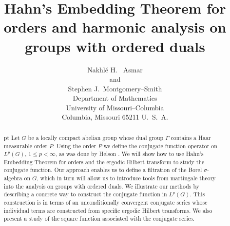 \setlength\textwidth{6in}
\setlength\oddsidemargin{0.25in}
\topmargin -20mm
\footskip 12mm
\textheight 56pc
\def\Bbb#1{{\mathchoice{\mbox{\bf #1}}{\mbox{\bf #1}}%
{\mbox{$\scriptstyle \bf #1$}}{\mbox{$\scriptscriptstyle \bf #1$}}}}
\def\N{\Bbb N}
\def\R{\Bbb R}
\def\C{\Bbb C}
\def\Z{\Bbb Z}
\def\T{\Bbb T}
\def\Q{\Bbb Q}
\def\E{\Bbb E}
\def\O{\Omega}
\def\sgn{{\rm sgn}}
\def\H{{\cal H}_P}
\def\e{\epsilon}
\def\A{{\cal A}}
\def\cT{{\cal T}}




\title{Hahn's Embedding Theorem for orders
and harmonic analysis on groups with ordered duals}
\author{Nakhl\'e H. \ Asmar\\
 and 
 \\Stephen J.\ Montgomery--Smith\\
Department of Mathematics\\
University of
Missouri--Columbia\\
Columbia, Missouri 65211  U.\ S.\ A.
}
\date{}
\maketitle
\begin{abstract}
 pt
Let $G$ be a locally compact abelian group whose dual
group $\Gamma$ contains a Haar measurable order $P$.
Using the order $P$ we define the conjugate function
operator on $L^p(G)$, $1\leq p<\infty$,
 as was done by Helson \cite{hel1}.
We will show how to use Hahn's Embedding Theorem
for orders and the ergodic Hilbert transform to study the 
conjugate function.
Our approach enables us to 
define a filtration of the Borel $\sigma$-algebra
on $G$, which in turn will allow us to introduce 
tools from martingale theory into the analysis on 
groups with ordered duals.
We illustrate our methods by 
describing a concrete way to construct the conjugate function
in $L^p(G)$.  
This construction is
in terms of an unconditionally convergent 
conjugate series
whose individual terms are 
constructed from specific ergodic Hilbert transforms.
We also present a study of the square function associated with
the conjugate series.
\end{abstract}

